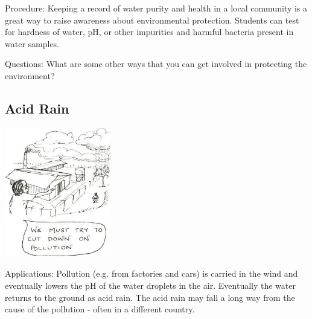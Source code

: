 \begin{multicols}{2}
\begin{description*}
\item[Procedure:]{Keeping a record of water purity and health in a local community is a great way to raise awareness about environmental protection. Students can test for hardness of water, pH, or other impurities and harmful bacteria present in water samples.}
\item[Questions:]{What are some other ways that you can get involved in protecting the environment?}
\end{description*}

\subsection{Acid Rain} 

\begin{center}
\includegraphics[width=0.35\textwidth]{./img/source/acid-rain.jpg}
\end{center}

\begin{description*}
\item[Applications:]{Pollution (e.g. from factories and cars) is carried in the wind and eventually lowers the pH of the water droplets in the air. Eventually the water returns to the ground as acid rain. The acid rain may fall a long way from the cause of the pollution - often in a different country.}
\end{description*}


\end{multicols}
